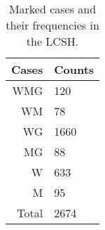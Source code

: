 \begin{table}
	\caption{Marked cases and their frequencies in the LCSH.}
	\begin{center}
		\begin{tabular}{rl}
			\toprule
			Cases & Counts \\
			\midrule
			WMG & 120 \\
			WM & 78 \\
			WG & 1660 \\
			MG & 88 \\
			W & 633 \\
			M & 95 \\
			Total & 2674 \\
			\bottomrule
		\end{tabular}
	\end{center}
	\label{tab:markedness}
\end{table}